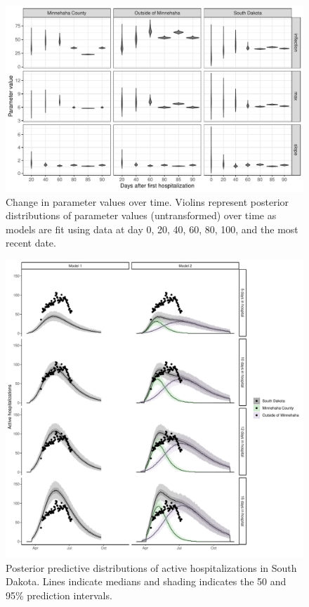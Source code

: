 \documentclass[
]{article}
\begin{document}
\begin{figure}
\centering
\includegraphics{test_files/figure-latex/unnamed-chunk-3-1.pdf}
\caption{\label{fig:unnamed-chunk-3}Change in parameter values over time. Violins represent posterior distributions of parameter values (untransformed) over time as models are fit using data at day 0, 20, 40, 60, 80, 100, and the most recent date.\label{param_time_plot:plot}}
\end{figure}

\begin{figure}
\centering
\includegraphics{test_files/figure-latex/unnamed-chunk-4-1.pdf}
\caption{\label{fig:unnamed-chunk-4}Posterior predictive distributions of active hospitalizations in South Dakota. Lines indicate medians and shading indicates the 50 and 95\% prediction intervals.\label{active_daily_group:plot}}
\end{figure}
\end{document}
